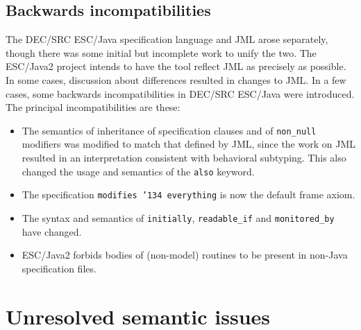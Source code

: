 \documentclass{sig-alternate}
\begin{document}
\subsection{Backwards incompatibilities}
The DEC/SRC ESC/Java specification language and JML arose separately, though there
was some initial but incomplete work to unify the two.  The ESC/Java2
project intends to have the tool reflect JML as precisely as possible.
In some cases, discussion about differences resulted in changes to JML.  In
a few cases, some backwards incompatibilities in DEC/SRC ESC/Java were
introduced.  The principal incompatibilities are these:
\setlength{\partopsep}{0in}\setlength{\parskip}{0in}\setlength{\itemsep}{0in}\setlength{\topsep}{0in}
\begin{itemize}
\setlength{\partopsep}{0in}\setlength{\parskip}{0in}\setlength{\itemsep}{0in}\setlength{\topsep}{0in}
\item The semantics of inheritance of specification clauses and of
  \texttt{non\_null} modifiers was modified to match that defined by
  JML, since the work on JML resulted in an interpretation consistent
  with behavioral subtyping.  This also changed the usage and
  semantics of the \texttt{also} keyword.
\item The specification \texttt{modifies \char'134 everything} is now the default
  frame axiom.
\item The syntax and semantics of \texttt{initially}, \texttt{readable\_if} 
 and \texttt{monitored\_by} have changed.
\item ESC/Java2 forbids bodies of (non-model) routines to be present
  in non-Java specification files.
\end{itemize}

\section{Unresolved semantic issues}
\end{document}
